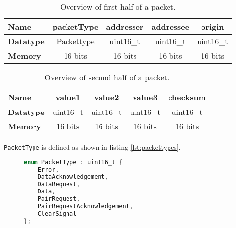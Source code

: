 \begin{table}[]
\centering
\begin{tabular}{|l|c|l|c|l|c|l|c|l|}
\hline
\textbf{Name}     & \multicolumn{2}{c|}{packetType}      & \multicolumn{2}{c|}{addresser}       & \multicolumn{2}{c|}{addressee}       & \multicolumn{2}{c|}{origin}          \\ \hline
\textbf{Datatype} & \multicolumn{2}{c|}{Packettype}      & \multicolumn{2}{c|}{uint16\_t}       & \multicolumn{2}{c|}{uint16\_t}       & \multicolumn{2}{c|}{uint16\_t}       \\ \hline
\textbf{Memory}   & \multicolumn{2}{c|}{16 bits} & \multicolumn{2}{c|}{16 bits} & \multicolumn{2}{c|}{16 bits} & \multicolumn{2}{c|}{16 bits} \\ \hline
\end{tabular}
\caption{Overview of first half of a packet.}
\label{tab:packetTableFirst}
\end{table}

\begin{table}[]
\centering
\begin{tabular}{|l|c|l|c|l|c|l|c|l|}
\hline
\textbf{Name}     & \multicolumn{2}{c|}{value1}         & \multicolumn{2}{c|}{value2}         & \multicolumn{2}{c|}{value3}   & \multicolumn{2}{c|}{checksum}        \\ \hline
\textbf{Datatype} & \multicolumn{2}{c|}{uint16\_t}       & \multicolumn{2}{c|}{uint16\_t}       & \multicolumn{2}{l|}{uint16\_t} & \multicolumn{2}{c|}{uint16\_t}       \\ \hline
\textbf{Memory}   & \multicolumn{2}{c|}{16 bits} & \multicolumn{2}{c|}{16 bits} & \multicolumn{2}{c|}{16 bits} & \multicolumn{2}{c|}{16 bits} \\ \hline
\end{tabular}
\caption{Overview of second half of a packet.}
\label{tab:packetTableSecond}
\end{table}

\texttt{PacketType} is defined as shown in listing \ref{lst:packettypes}.
\begin{figure}
\begin{lstlisting}[language=C,label={lst:packettypes},caption={Packet types}]
enum PacketType : uint16_t {
    Error,
    DataAcknowledgement,
    DataRequest,
    Data,
    PairRequest,
    PairRequestAcknowledgement,
    ClearSignal
};
\end{lstlisting}
\end{figure}

